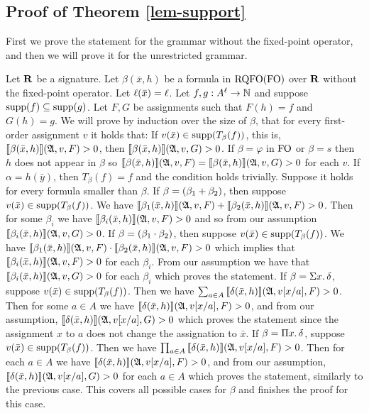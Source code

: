 \subsection*{Proof of Theorem \ref{lem-support}}

First we prove the statement for the grammar without the fixed-point operator, and then we will prove it for the unrestricted grammar.

Let $\mathbf{R}$ be a signature. Let $\beta(\bar{x},h)$ be a formula in ${\rm RQFO}({\rm FO})$ over $\mathbf{R}$ without the fixed-point operator. Let $\ell(\bar{x}) = \ell$. Let $f,g :A^{\ell}\to\mathbb{N}$ and suppose $\text{\rm supp}(f) \subseteq \text{\rm supp}(g)$. Let $F,G$ be assignments such that $F(h) = f$ and $G(h) = g$. We will prove by induction over the size of $\beta$, that for every first-order assignment $v$ it holds that: If $v(\bar{x})\in\text{\rm supp}(T_{\beta}(f))$, this is, ${\llbracket{}{\beta(\bar{x},h)}\rrbracket}(\mathfrak{A},v,F) > 0$, then ${\llbracket{}{\beta(\bar{x},h)}\rrbracket}(\mathfrak{A},v,G) > 0$.
If $\beta = \varphi$ in ${\rm FO}$ or $\beta = s$ then $h$ does not appear in $\beta$ so ${\llbracket{}{\beta(\bar{x},h)}\rrbracket}(\mathfrak{A},v,F) = {\llbracket{}{\beta(\bar{x},h)}\rrbracket}(\mathfrak{A},v,G) > 0$ for each $v$. If $\alpha = h(\bar{y})$, then $T_{\beta}(f) = f$ and the condition holds trivially. Suppose it holds for every formula smaller than $\beta$. If $\beta = (\beta_1 + \beta_2)$, then suppose $v(\bar{x})\in\text{\rm supp}(T_{\beta}(f))$. We have ${\llbracket{}{\beta_1(\bar{x},h)}\rrbracket}(\mathfrak{A},v,F) + {\llbracket{}{\beta_2(\bar{x},h)}\rrbracket}(\mathfrak{A},v,F) > 0$. Then for some $\beta_i$ we have ${\llbracket{}{\beta_i(\bar{x},h)}\rrbracket}(\mathfrak{A},v,F) > 0$ and so from our assumption ${\llbracket{}{\beta_i(\bar{x},h)}\rrbracket}(\mathfrak{A},v,G) > 0$. 
If $\beta = (\beta_1 \cdot \beta_2)$, then suppose $v(\bar{x})\in\text{\rm supp}(T_{\beta}(f))$. We have ${\llbracket{}{\beta_1(\bar{x},h)}\rrbracket}(\mathfrak{A},v,F) \cdot {\llbracket{}{\beta_2(\bar{x},h)}\rrbracket}(\mathfrak{A},v,F) > 0$ which implies that ${\llbracket{}{\beta_i(\bar{x},h)}\rrbracket}(\mathfrak{A},v,F) > 0$ for each $\beta_i$. From our assumption we have that ${\llbracket{}{\beta_i(\bar{x},h)}\rrbracket}(\mathfrak{A},v,G) > 0$ for each $\beta_i$ which proves the statement. If $\beta = \Sigma{x}.\,\delta$, suppose $v(\bar{x})\in\text{\rm supp}(T_{\beta}(f))$. Then we have $\sum_{a\in A}{\llbracket{}{\delta(\bar{x},h)}\rrbracket}(\mathfrak{A},v[x/a],F) > 0$. Then for some $a\in A$ we have ${\llbracket{}{\delta(\bar{x},h)}\rrbracket}(\mathfrak{A},v[x/a],F) > 0$, and from our assumption, ${\llbracket{}{\delta(\bar{x},h)}\rrbracket}(\mathfrak{A},v[x/a],G) > 0$ which proves the statement since the assignment $x$ to $a$ does not change the assignation to $\bar{x}$. If $\beta = \Pi{x}.\,\delta$, suppose $v(\bar{x})\in\text{\rm supp}(T_{\beta}(f))$.
Then we have $\prod_{a\in A}{\llbracket{}{\delta(\bar{x},h)}\rrbracket}(\mathfrak{A},v[x/a],F) > 0$. Then for each $a\in A$ we have ${\llbracket{}{\delta(\bar{x},h)}\rrbracket}(\mathfrak{A},v[x/a],F) > 0$, and from our assumption, ${\llbracket{}{\delta(\bar{x},h)}\rrbracket}(\mathfrak{A},v[x/a],G) > 0$ for each $a\in A$ which proves the statement, similarly to the previous case. This covers all possible cases for $\beta$ and finishes the proof for this case.

